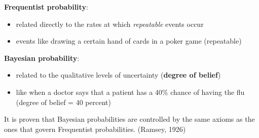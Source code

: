 \documentclass[11pt, twocolumn]{report}
\begin{document}
\textbf{Frequentist probability}:
\begin{itemize}
  \item related directly to the rates at which \textit{repeatable} events occur
  \item events like drawing a certain hand of cards in a poker game (repeatable)
\end{itemize}

\textbf{Bayesian probability}:
\begin{itemize}
  \item related to the qualitative levels of uncertainty (\textbf{degree of
      belief})
  \item like when a doctor says that a patient has a 40\% chance of having the
    flu (degree of belief = 40 percent)
\end{itemize}

It is proven that Bayesian probabilities are controlled by the same axioms as
the ones that govern Frequentist probabilities. (Ramsey, 1926)
\end{document}
